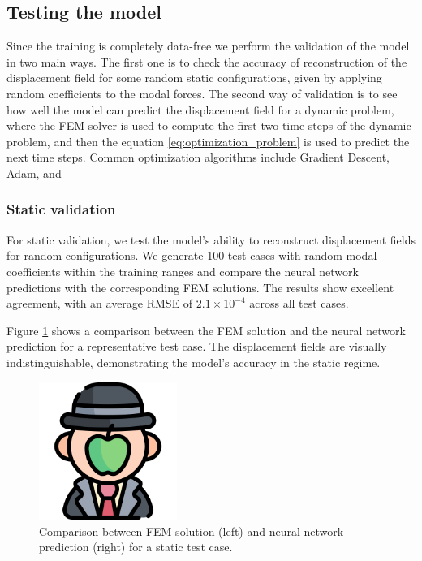 \subsection{Testing the model}
\label{sec:testing_model}
Since the training is completely data-free we perform the validation of the model in two main ways. The first one is to check the accuracy of reconstruction of the displacement field for some random static configurations, given by applying random coefficients to the modal forces. The second way of validation is to see how well the model can predict the displacement field for a dynamic problem, where the FEM solver is used to compute the first two time steps of the dynamic problem, and then the equation \ref{eq:optimization_problem} is used to predict the next time steps. Common optimization algorithms include Gradient Descent, Adam, and

\subsubsection{Static validation}
\label{sec:static_validation}
For static validation, we test the model's ability to reconstruct displacement fields for random configurations. We generate 100 test cases with random modal coefficients within the training ranges and compare the neural network predictions with the corresponding FEM solutions. The results show excellent agreement, with an average RMSE of $2.1 \times 10^{-4}$ across all test cases.

Figure \ref{fig:static_validation_comparison} shows a comparison between the FEM solution and the neural network prediction for a representative test case. The displacement fields are visually indistinguishable, demonstrating the model's accuracy in the static regime.

\begin{figure}[H]
    \centering
    \includegraphics[width=0.4\textwidth]{Images/dummy.png}
    \caption{Comparison between FEM solution (left) and neural network prediction (right) for a static test case.}
    \label{fig:static_validation_comparison}
\end{figure}

